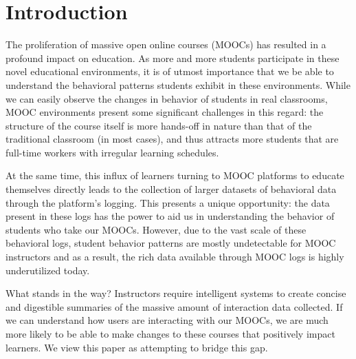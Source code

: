 \section{Introduction}

The proliferation of massive open online courses (MOOCs) has resulted in a
profound impact on education. As more and more students participate in
these novel educational environments, it is of utmost importance that we be
able to understand the behavioral patterns students exhibit in these
environments. While we can easily observe the changes in behavior of
students in real classrooms, MOOC environments present some significant
challenges in this regard: the structure of the course itself is more
hands-off in nature than that of the traditional classroom (in most cases),
and thus attracts more students that are full-time workers with irregular
learning schedules.

At the same time, this influx of learners turning to MOOC platforms to
educate themselves directly leads to the collection of larger datasets of
behavioral data through the platform's logging. This presents a unique
opportunity: the data present in these logs has the power to aid us in
understanding the behavior of students who take our MOOCs. However, due to
the vast scale of these behavioral logs, student behavior patterns are
mostly undetectable for MOOC instructors and as a result, the rich data
available through MOOC logs is highly underutilized today.

What stands in the way? Instructors require intelligent systems to create
concise and digestible summaries of the massive amount of interaction data
collected. If we can understand how users are interacting with our MOOCs,
we are much more likely to be able to make changes to these courses that
positively impact learners. We view this paper as attempting to bridge this
gap.

